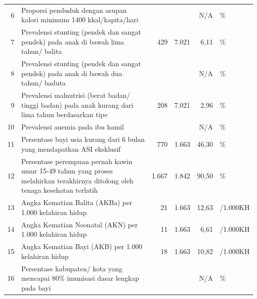 \begin{center}
\begin{longtable}{rY{12em}rrrY{6em}}
                   6  & Proporsi penduduk dengan asupan kalori minimum 1400 kkal/kapita/hari                                                           &         &         &    N/A & \%                  \\
                                     7  & Prevalensi stunting (pendek dan sangat pendek) pada anak di bawah lima tahun/ balita                        					 &     429 &   7.021 &   6,11 & \%                  \\
                   8  & Prevalensi stunting (pendek dan sangat pendek) pada anak di bawah dua tahun/ baduta                                            &         &         &    N/A & \%                  \\
                                     9  & Prevalensi malnutrisi (berat badan/ tinggi badan) pada anak kurang dari lima tahun berdasarkan tipe         					 &     208 &   7.021 &   2,96 & \%                  \\
                   10 & Prevalensi anemia pada ibu hamil                                                                                               &         &         &    N/A & \%                  \\
                                     11 & Persentase bayi usia kurang dari 6 bulan yang mendapatkan ASI eksklusif                                             			 &     770 &   1.663 &  46,30 & \%                  \\
                   12 & Persentase perempuan pernah kawin umur 15-49 tahun yang proses melahirkan terakhirnya ditolong oleh tenaga kesehatan terlatih  &   1.667 &   1.842 &  90,50 & \%                  \\
                                     13 & Angka Kematian Balita (AKBa) per 1.000 kelahiran hidup                                                       					 &      21 &   1.663 &  12,63 & /1.000KH            \\
                   14 & Angka Kematian Neonatal (AKN) per 1.000 kelahiran hidup                                                                        &      11 &   1.663 &   6,61 & /1.000KH            \\
                                     15 & Angka Kematian Bayi (AKB) per 1.000 kelahiran hidup                                                          					 &      18 &   1.663 &  10,82 & /1.000KH            \\
                   16 & Persentase kabupaten/ kota yang mencapai 80\% imunisasi dasar lengkap pada bayi                                                &         &         &    N/A & \%                  \\

\end{longtable}
\end{center}

